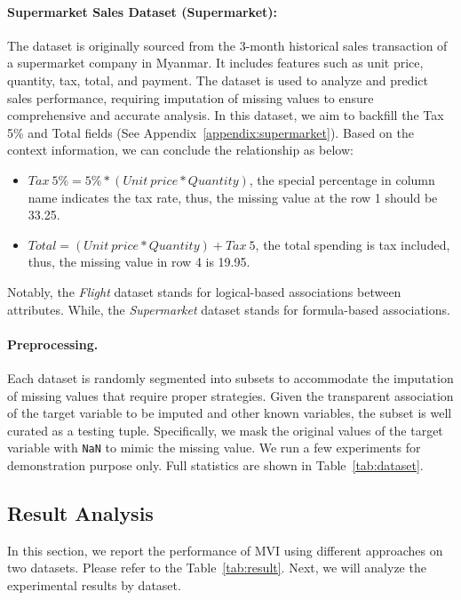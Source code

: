 \documentclass[sigconf]{acmart}
\begin{document}
\paragraph{Supermarket Sales Dataset (Supermarket):} The dataset is originally sourced from the 3-month historical sales transaction of a supermarket company in Myanmar. It includes features such as unit price, quantity, tax, total, and payment. The dataset is used to analyze and predict sales performance, requiring imputation of missing values to ensure comprehensive and accurate analysis. In this dataset, we aim to backfill the Tax 5\% and Total fields (See Appendix~\ref{appendix:supermarket}). Based on the context information, we can conclude the relationship as below:
\begin{itemize}
  \item $Tax\ 5\% = 5\% * (Unit\ price * Quantity)$, the special percentage in column name indicates the tax rate, thus, the missing value at the row 1 should be 33.25.
  \item $Total = (Unit\ price * Quantity) + Tax\ 5$, the total spending is tax included, thus, the missing value in row 4 is 19.95.
\end{itemize}

Notably, the \emph{Flight} dataset stands for logical-based associations between attributes. While, the \emph{Supermarket} dataset stands for formula-based associations.


\paragraph{Preprocessing.}
Each dataset is randomly segmented into subsets to accommodate the imputation of missing values that require proper strategies. Given the transparent association of the target variable to be imputed and other known variables, the subset is well curated as a testing tuple. Specifically, we mask the original values of the target variable with {\tt NaN} to mimic the missing value. We run a few experiments for demonstration purpose only. Full statistics are shown in Table~\ref{tab:dataset}.


\subsection{Result Analysis}
In this section, we report the performance of MVI using different approaches on two datasets. Please refer to the Table~\ref{tab:result}. Next, we will analyze the experimental results by dataset.
\end{document}
